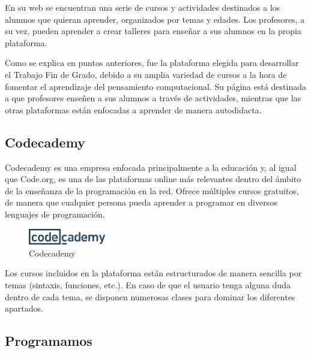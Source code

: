 En su web se encuentran una serie de cursos y actividades destinados a los alumnos que quieran aprender, organizados por temas y edades. Los profesores, a su vez, pueden aprender a crear talleres para enseñar a sus alumnos en la propia plataforma.

Como se explica en puntos anteriores, fue la plataforma elegida para desarrollar el Trabajo Fin de Grado, debido a su amplia variedad de cursos a la hora de fomentar el aprendizaje del pensamiento computacional. Su página está destinada a que profesores
enseñen a sus alumnos a través de actividades, mientras que las otras plataformas están enfocadas a aprender de manera autodidacta.


\subsection{Codecademy}
\label{2:sec:3}

Codecademy es una empresa enfocada principalmente a la educación y, al igual que Code.org, es una de las plataformas online más relevantes dentro del ámbito de la enseñanza de la programación en la red. Ofrece múltiples cursos gratuitos, de manera que cualquier
persona pueda aprender a programar en diversos lenguajes de programación.

\newpage
\begin{figure}[!th]
\begin{center}
\includegraphics[width=0.3\textwidth]{images/captura_codecademy.eps}
\caption{Codecademy}
\label{fig:2}
\end{center}
\end{figure}

Los cursos incluidos en la plataforma están estructurados de manera sencilla por temas (sintaxis, funciones, etc.). En caso de que el usuario tenga alguna duda dentro de cada tema, se disponen numerosas clases para dominar los diferentes apartados.


\subsection{Programamos}
\label{2:sec:4}

